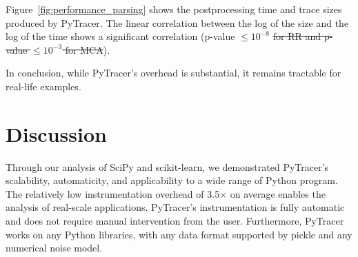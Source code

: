 \documentclass[10pt,journal,compsoc]{IEEEtran}
\newcommand{\pytracer}[0]{PyTracer\xspace}
\DeclareRobustCommand{\remove}[1]{\textcolor{lightred}{\sout{#1}}}
\begin{document}

Figure~\ref{fig:performance_parsing} shows the postprocessing time and trace
sizes produced by \pytracer. The linear correlation between the log of the size
and the log of the time shows a significant correlation (p-value $\leq 10^{-8}$
\remove{for RR and p-value $\leq 10^{-3}$ for MCA}).

In conclusion, while \pytracer's overhead is substantial, it remains tractable
for real-life examples.

\section{Discussion}



Through our analysis of SciPy and scikit-learn, we demonstrated \pytracer's
scalability, automaticity, and applicability to a wide range of Python program.
The relatively low instrumentation overhead of 3.5$\times$ on average enables
the analysis of real-scale applications. \pytracer's instrumentation is fully
automatic and does not require manual intervention from the user. Furthermore,
\pytracer works on any Python libraries, with any data format supported by
pickle and any numerical noise model.
\end{document}
